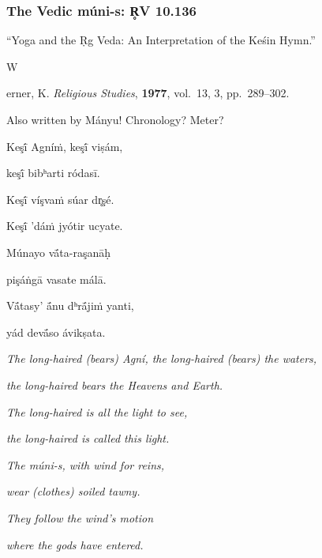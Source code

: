 \documentclass[pdf]{beamer}
\newcommand{\Subitem}[1]{{\setlength\itemindent{12pt} \item[-] #1}}
\begin{document}
\begin{frame} \frametitle{The Vedic múni-s: R̥V 10.136}
\begin{itemize}
	\item ``Yoga and the Ṛg Veda: An Interpretation of the Keśin Hymn.''
	\Subitem Werner, K. \emph{Religious Studies}, \textbf{1977}, vol.~13, 3, pp.~289--302.
	\item Also written by Mányu! Chronology? Meter?
\end{itemize}
\pause
\begin{center}
\begin{multicols}{2}
\scriptsize{
	Keşī́ Agníṁ, keşī́ viṣám,

	\vspace{\baselineskip}

	keşī́ bibʰarti ródasī.

	Keşī́ víşvaṁ súar dr̥şé.

	Keşī́ 'dáṁ jyótir ucyate.

	\vspace{\baselineskip}

	Múnayo vā́ta-raşanāḥ

	pişáṅgā vasate málā.

	Vā́tasy' ā́nu dʰrā́jiṁ yanti,

	yád devā́so ávikṣata.

	\columnbreak

	\textit{The long-haired (bears) Agní, the long-haired (bears) the waters,}

	\textit{the long-haired bears the Heavens and Earth.}

	\textit{The long-haired is all the light to see,}

	\textit{the long-haired is called this light.}

	\vspace{\baselineskip}

	\textit{The múni-s, with wind for reins,}

	\textit{wear (clothes) soiled tawny.}

	\textit{They follow the wind's motion}

	\textit{where the gods have entered.}
}
\end{multicols}
\end{center}
\end{frame}
\end{document}
